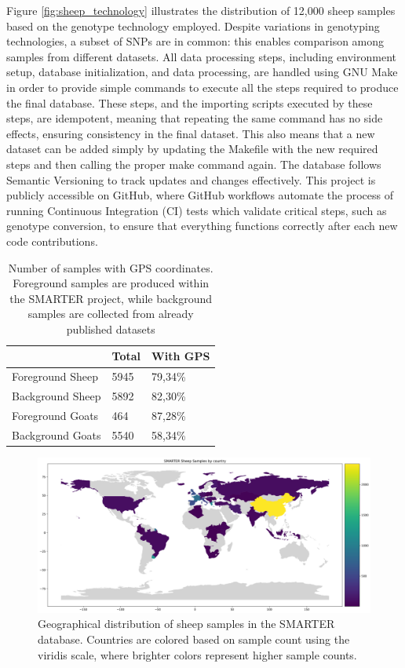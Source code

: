 \documentclass[a4paper,num-refs,gigabyte]{oup-contemporary}
\begin{document}
Figure \ref{fig:sheep_technology} illustrates the distribution of 12,000 sheep samples based on the genotype technology employed. Despite variations in genotyping technologies, a subset of SNPs are in common: this enables comparison among samples from different datasets.
All data processing steps, including environment setup, database initialization, and data processing, are handled using GNU Make\citep{Stallman2004} in order to provide simple commands to execute all the steps required to produce the final database. These steps, and the importing scripts executed by these steps, are idempotent, meaning that repeating the same command has no side effects, ensuring consistency in the final dataset. This also means that a new dataset can be added simply by updating the Makefile with the new required steps and then calling the proper make command again. The database follows Semantic Versioning\citep{prestonwerner2013semantic} to track updates and changes effectively. This project is publicly accessible on GitHub\citep{SMARTERDB-GH}, where GitHub workflows automate the process of running Continuous Integration (CI) tests which validate critical steps, such as genotype conversion, to ensure that everything functions correctly after each new code contributions.

\begin{table}
\caption{Number of samples with GPS coordinates. Foreground samples are produced within the SMARTER project, while background samples are collected from already published datasets}
\label{tab:samples}
\begin{center}
\begin{tabular}{l l l}
\toprule
& Total & With GPS \\
\midrule
Foreground Sheep & 5945 & 79,34\% \\
Background Sheep & 5892 & 82,30\% \\
Foreground Goats & 464 & 87,28\% \\
Background Goats & 5540 & 58,34\% \\
\bottomrule
\end{tabular}
\end{center}
\end{table}

\begin{figure}
\centering
\includegraphics[width=.95\textwidth]{sheep-by-country.png}
\caption{Geographical distribution of sheep samples in the SMARTER database. Countries are colored based on sample count using the viridis scale, where brighter colors represent higher sample counts.}
\label{fig:sheep_samples}
\end{figure}
\end{document}
